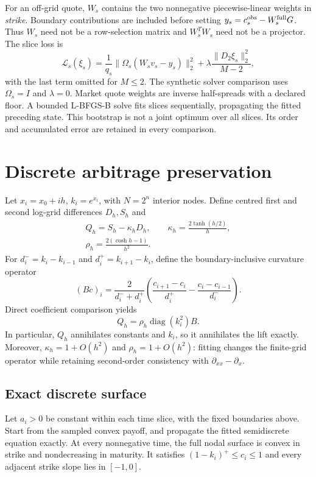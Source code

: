 \documentclass[10pt]{article}
\newcommand{\diag}{\operatorname{diag}}
\newcommand{\norm}[1]{\lVert #1\rVert}
\begin{document}
For an off-grid quote, $W_s$ contains the two nonnegative piecewise-linear weights in \emph{strike}. Boundary contributions are included before setting $y_s=c_s^{\rm obs}-W_s^{\rm full}G$. Thus $W_s$ need not be a row-selection matrix and $W_s^TW_s$ need not be a projector. The slice loss is
\begin{equation}
 \mathcal L_s(\xi_s)=\frac1{q_s}\norm{\Omega_s(W_s v_s-y_s)}_2^2
 +\lambda\frac{\norm{D_2\xi_s}_2^2}{M-2}, \label{eq:loss}
\end{equation}
with the last term omitted for $M\leq2$. The synthetic solver comparison uses $\Omega_s=I$ and $\lambda=0$. Market quote weights are inverse half-spreads with a declared floor. A bounded L-BFGS-B solve fits slices sequentially, propagating the fitted preceding state. This bootstrap is not a joint optimum over all slices. Its order and accumulated error are retained in every comparison.

\section{Discrete arbitrage preservation}
Let $x_i=x_0+ih$, $k_i=e^{x_i}$, with $N=2^n$ interior nodes. Define centred first and second log-grid differences $D_h,S_h$ and
\begin{equation}
 \begin{gathered}
 Q_h=S_h-\kappa_hD_h,\qquad\kappa_h=\frac{2\tanh(h/2)}h,\\
 \rho_h=\frac{2(\cosh h-1)}{h^2}.
 \end{gathered}\label{eq:fitted}
\end{equation}
For $d_i^-=k_i-k_{i-1}$ and $d_i^+=k_{i+1}-k_i$, define the boundary-inclusive curvature operator
\begin{equation}
 (Bc)_i=\frac{2}{d_i^-+d_i^+}
 \left(\frac{c_{i+1}-c_i}{d_i^+}-\frac{c_i-c_{i-1}}{d_i^-}\right). \label{eq:B}
\end{equation}
Direct coefficient comparison yields
\begin{equation}
 Q_h=\rho_h\diag(k_i^2)B. \label{eq:identity}
\end{equation}
In particular, $Q_h$ annihilates constants and $k_i$, so it annihilates the lift exactly. Moreover, $\kappa_h=1+O(h^2)$ and $\rho_h=1+O(h^2)$: fitting changes the finite-grid operator while retaining second-order consistency with $\partial_{xx}-\partial_x$.

\subsection{Exact discrete surface}
Let $a_i>0$ be constant within each time slice, with the fixed boundaries above. Start from the sampled convex payoff, and propagate the fitted semidiscrete equation exactly. At every nonnegative time, the full nodal surface is convex in strike and nondecreasing in maturity. It satisfies $(1-k_i)^+\leq c_i\leq1$ and every adjacent strike slope lies in $[-1,0]$.
\end{document}
